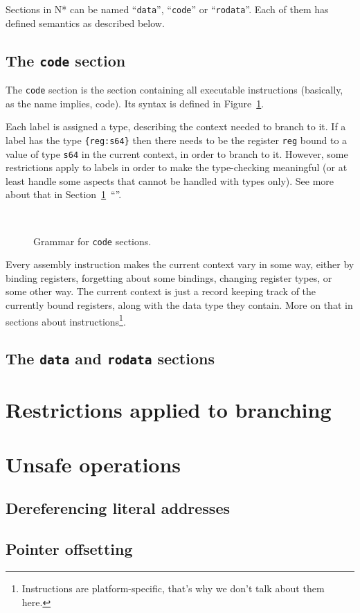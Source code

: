 Sections in N* can be named ``\texttt{data}'', ``\texttt{code}'' or ``\texttt{rodata}''. Each of them has defined semantics as described below.

\subsection{The \texttt{code} section}\label{subsec:nstar-common-sections-code}

The \texttt{code} section is the section containing all executable instructions (basically, as the name implies, code). Its syntax is defined in Figure~\ref{fig:nstar-common-sections-code-grammar}.

Each label is assigned a type, describing the context needed to branch to it.
If a label has the type \texttt{\{reg:s64\}} then there needs to be the register \texttt{reg} bound to a value of type \texttt{s64} in the current context, in order to branch to it.
However, some restrictions apply to labels in order to make the type-checking meaningful (or at least handle some aspects that cannot be handled with types only). See more about that in Section~\ref{sec:nstar-common-bs}~``''.

\begin{figure}[htb]
  \centering
  \\

  \caption{Grammar for \texttt{code} sections.}
  \label{fig:nstar-common-sections-code-grammar}
\end{figure}

Every assembly instruction makes the current context vary in some way, either by binding registers, forgetting about some bindings, changing register types, or some other way. The current context is just a record keeping track of the currently bound registers, along with the data type they contain. More on that in sections about instructions\footnote{Instructions are platform-specific, that's why we don't talk about them here.}.

\subsection{The \texttt{data} and \texttt{rodata} sections}\label{subsec:nstar-common-sections-data}

\section{Restrictions applied to branching}\label{sec:nstar-common-bs}

\section{Unsafe operations}\label{sec:nstar-common-unsafe}

\subsection{Dereferencing literal addresses}\label{subsec:nstar-common-unsafe-derefliteraladdr}

\subsection{Pointer offsetting}\label{subsec:nstar-common-unsafe-ptroffset}
